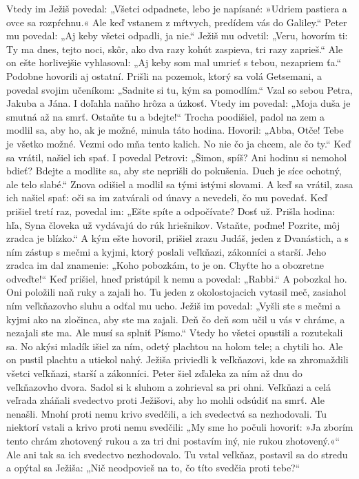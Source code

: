 Vtedy im Ježiš povedal: „Všetci odpadnete, lebo je napísané: »Udriem pastiera a ovce sa rozpŕchnu.« 
Ale keď vstanem z mŕtvych, predídem vás do Galiley.“ Peter mu povedal: „Aj keby všetci odpadli, ja nie.“ Ježiš mu odvetil: „Veru, hovorím ti: Ty ma dnes, tejto noci, skôr, ako dva razy kohút zaspieva, tri razy zaprieš.“ Ale on ešte horlivejšie vyhlasoval: „Aj keby som mal umrieť s tebou, nezapriem ťa.“ Podobne hovorili aj ostatní.
\versseparator
Prišli na pozemok, ktorý sa volá Getsemani, a povedal svojim učeníkom: „Sadnite si tu, kým sa pomodlím.“ Vzal so sebou Petra, Jakuba a Jána. I doľahla naňho hrôza a úzkosť. Vtedy im povedal: „Moja duša je smutná až na smrť. Ostaňte tu a bdejte!“ Trocha poodišiel, padol na zem a modlil sa, aby ho, ak je možné, minula táto hodina.
Hovoril: „Abba, Otče! Tebe je všetko možné. Vezmi odo mňa tento kalich. No nie čo ja chcem, ale čo ty.“ Keď sa vrátil, našiel ich spať. I povedal Petrovi: „Šimon, spíš? Ani hodinu si nemohol bdieť? Bdejte a modlite sa, aby ste neprišli do pokušenia. Duch je síce ochotný, ale telo slabé.“ Znova odišiel a modlil sa tými istými slovami. A keď sa vrátil, zasa ich našiel spať: oči sa im zatvárali od únavy a nevedeli, čo mu povedať. Keď prišiel tretí raz, povedal im: „Ešte spíte a odpočívate? Dosť už. Prišla hodina: hľa, Syna človeka už vydávajú do rúk hriešnikov. Vstaňte, poďme! Pozrite, môj zradca je blízko.“
\versseparator
A kým ešte hovoril, prišiel zrazu Judáš, jeden z Dvanástich, a s ním zástup s mečmi a kyjmi, ktorý poslali veľkňazi, zákonníci a starší. 
Jeho zradca im dal znamenie: „Koho pobozkám, to je on. Chyťte ho a obozretne odveďte!“ Keď prišiel, hneď pristúpil k nemu a povedal: „Rabbi.“ A pobozkal ho. Oni položili naň ruky a zajali ho. Tu jeden z okolostojacich vytasil meč, zasiahol ním veľkňazovho sluhu a odťal mu ucho. Ježiš im povedal: „Vyšli ste s mečmi a kyjmi ako na zločinca, aby ste ma zajali. Deň čo deň som učil u vás v chráme, a nezajali ste ma. Ale musí sa splniť Písmo.“ Vtedy ho všetci opustili a rozutekali sa.
No akýsi mladík išiel za ním, odetý plachtou na holom tele; a chytili ho. Ale on pustil plachtu a utiekol nahý.
\versseparator
Ježiša priviedli k veľkňazovi, kde sa zhromaždili všetci veľkňazi, starší a zákonníci. Peter šiel zďaleka za ním až dnu do veľkňazovho dvora. Sadol si k sluhom a zohrieval sa pri ohni. Veľkňazi a celá veľrada zháňali svedectvo proti Ježišovi, aby ho mohli odsúdiť na smrť. Ale nenašli. Mnohí proti nemu krivo svedčili, a ich svedectvá sa nezhodovali. Tu niektorí vstali a krivo proti nemu svedčili: „My sme ho počuli hovoriť: »Ja zborím tento chrám zhotovený rukou a za tri dni postavím iný, nie rukou zhotovený.«“ Ale ani tak sa ich svedectvo nezhodovalo. Tu vstal veľkňaz, postavil sa do stredu a opýtal sa Ježiša: „Nič neodpovieš na to, čo títo svedčia proti tebe?“
